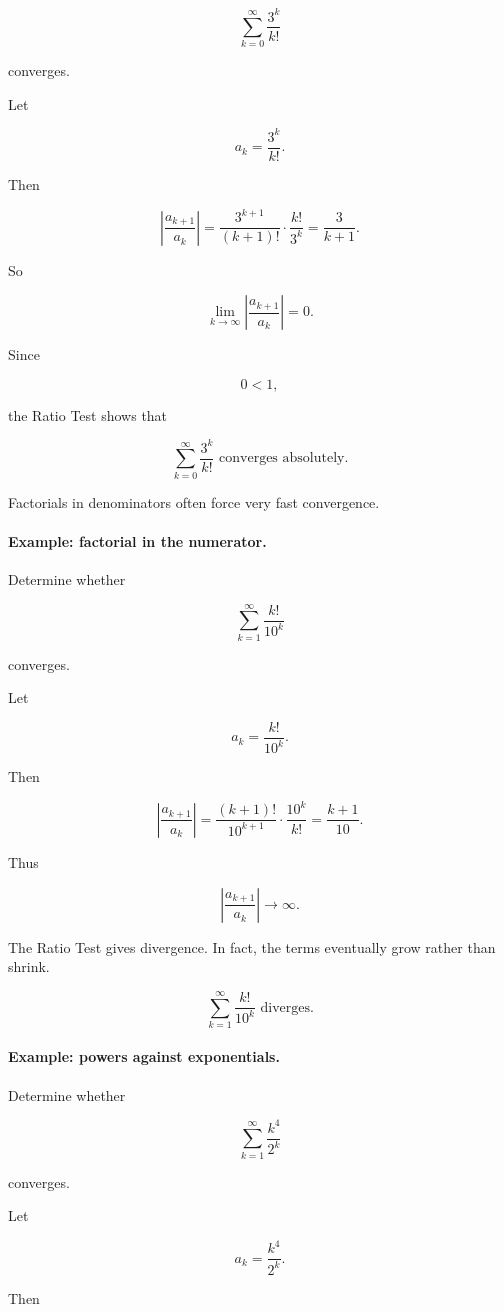 \[
\sum_{k=0}^{\infty}\frac{3^k}{k!}
\]

converges.

Let

\[
a_k=\frac{3^k}{k!}.
\]

Then

\[
\left|\frac{a_{k+1}}{a_k}\right|
=
\frac{3^{k+1}}{(k+1)!}\cdot\frac{k!}{3^k}
=
\frac3{k+1}.
\]

So

\[
\lim_{k\to\infty}\left|\frac{a_{k+1}}{a_k}\right|
=
0.
\]

Since

\[
0<1,
\]

the Ratio Test shows that

\[
\boxed{
\sum_{k=0}^{\infty}\frac{3^k}{k!}
\text{ converges absolutely.}
}
\]

Factorials in denominators often force very fast convergence.

\paragraph{Example: factorial in the numerator.}
Determine whether

\[
\sum_{k=1}^{\infty}\frac{k!}{10^k}
\]

converges.

Let

\[
a_k=\frac{k!}{10^k}.
\]

Then

\[
\left|\frac{a_{k+1}}{a_k}\right|
=
\frac{(k+1)!}{10^{k+1}}\cdot\frac{10^k}{k!}
=
\frac{k+1}{10}.
\]

Thus

\[
\left|\frac{a_{k+1}}{a_k}\right|\to\infty.
\]

The Ratio Test gives divergence.  In fact, the terms eventually grow rather than shrink.

\[
\boxed{
\sum_{k=1}^{\infty}\frac{k!}{10^k}
\text{ diverges.}
}
\]

\paragraph{Example: powers against exponentials.}
Determine whether

\[
\sum_{k=1}^{\infty}\frac{k^4}{2^k}
\]

converges.

Let

\[
a_k=\frac{k^4}{2^k}.
\]

Then

